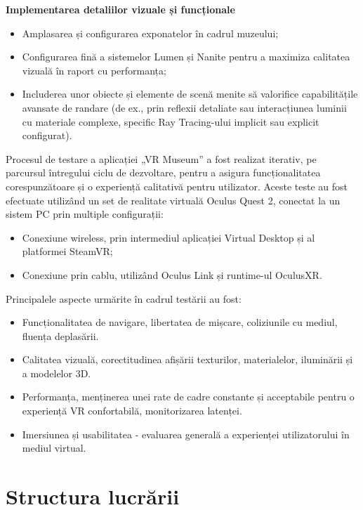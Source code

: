 \noindent \textbf{Implementarea detaliilor vizuale și funcționale}

\begin{itemize}
  \item Amplasarea și configurarea exponatelor în cadrul muzeului;
  \item Configurarea fină a sistemelor Lumen și Nanite pentru a maximiza calitatea vizuală în raport cu performanța;
  \item Includerea unor obiecte și elemente de scenă menite să valorifice capabilitățile avansate de randare (de ex., prin reflexii detaliate sau interacțiunea luminii cu materiale complexe, specific Ray Tracing-ului implicit sau explicit configurat).
\end{itemize}

Procesul de testare a aplicației „VR Museum” a fost realizat iterativ, pe parcursul întregului ciclu de dezvoltare, pentru a asigura funcționalitatea corespunzătoare și o experiență calitativă pentru utilizator. Aceste teste au fost efectuate utilizând un set de realitate virtuală Oculus Quest 2, conectat la un sistem PC prin multiple configurații:

\begin{itemize}
  \item Conexiune wireless, prin intermediul aplicației Virtual Desktop și al platformei SteamVR;
  \item Conexiune prin cablu, utilizând Oculus Link și runtime-ul OculusXR.
\end{itemize}

\noindent Principalele aspecte urmărite în cadrul testării au fost:

\begin{itemize}
    \item Funcționalitatea de navigare, libertatea de mișcare, coliziunile cu mediul, fluența deplasării.
    \item Calitatea vizuală, corectitudinea afișării texturilor, materialelor, iluminării și a modelelor 3D.
    \item Performanța, menținerea unei rate de cadre constante și acceptabile pentru o experiență VR confortabilă, monitorizarea latenței.
    \item Imersiunea și usabilitatea - evaluarea generală a experienței utilizatorului în mediul virtual.
\end{itemize}


\section{Structura lucrării}

